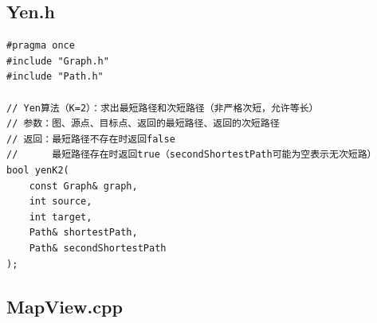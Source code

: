 \documentclass[UTF8,12pt,a4paper]{ctexart}
\begin{document}
\subsection{Yen.h}

\begin{lstlisting}[caption={Yen.h 源码}]
#pragma once
#include "Graph.h"
#include "Path.h"

// Yen算法（K=2）：求出最短路径和次短路径（非严格次短，允许等长）
// 参数：图、源点、目标点、返回的最短路径、返回的次短路径
// 返回：最短路径不存在时返回false
//      最短路径存在时返回true（secondShortestPath可能为空表示无次短路）
bool yenK2(
    const Graph& graph,
    int source,
    int target,
    Path& shortestPath,
    Path& secondShortestPath
);

\end{lstlisting}

\subsection{MapView.cpp}
\end{document}
